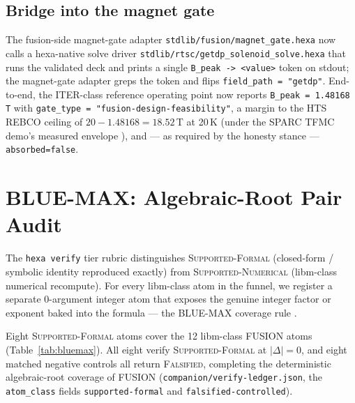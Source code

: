 \documentclass[11pt,a4paper]{article}
\begin{document}
\subsection{Bridge into the magnet gate}

The fusion-side magnet-gate adapter
\verb|stdlib/fusion/magnet_gate.hexa| now calls a hexa-native solve
driver \verb|stdlib/rtsc/getdp_solenoid_solve.hexa| that runs the
validated deck and prints a single \verb|B_peak -> <value>| token on
stdout; the magnet-gate adapter greps the token and flips
\texttt{field\_path = "getdp"}. End-to-end, the ITER-class reference
operating point now reports \verb|B_peak = 1.48168 T| with
\verb|gate_type = "fusion-design-feasibility"|, a margin to the HTS
REBCO ceiling of $20 - 1.48168 = 18.52$\,T at 20\,K (under the SPARC
TFMC demo's measured envelope \citep{hartwig2024sparcmagnet}), and
--- as required by the honesty stance --- \texttt{absorbed=false}.

\section{BLUE-MAX: Algebraic-Root Pair Audit}
\label{sec:bluemax}

The \texttt{hexa verify} tier rubric distinguishes
\textsc{Supported-Formal} (closed-form / symbolic identity reproduced
exactly) from \textsc{Supported-Numerical} (libm-class numerical
recompute). For every libm-class atom in the funnel, we register a
separate 0-argument integer atom that exposes the genuine integer
factor or exponent baked into the formula --- the BLUE-MAX coverage
rule \citep{anthropic2026hexag69}.

Eight \textsc{Supported-Formal} atoms cover the 12 libm-class FUSION
atoms (Table~\ref{tab:bluemax}). All eight verify
\textsc{Supported-Formal} at $|\Delta|=0$, and eight matched
negative controls all return \textsc{Falsified}, completing the
deterministic algebraic-root coverage of FUSION
(\texttt{companion/\allowbreak verify-ledger.json}, the
\verb|atom_class| fields \texttt{supported-formal} and
\texttt{falsified-controlled}).
\end{document}
